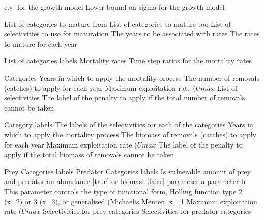  {c.v. for the growth model}
 {Lower bound on sigma for the growth model}
\par\textbf{}\par
{} {List of categories to mature from}
 {List of categories to mature too}
 {List of selectivities to use for maturation}
 {The years to be associated with rates}
 {The rates to mature for each year}
\par\textbf{}\par
{} {List of categories labels}
 {Mortality rates}
 {Time step ratios for the mortality rates}
\par\textbf{}\par
{} {Categories}
 {Years in which to apply the mortality process}
 {The number of removals (catches) to apply for each year}
 {Maximum exploitation rate ($Umax$}
 {List of selectivities}
 {The label of the penalty to apply if the total number of removals cannot be taken}
\par\textbf{}\par
{} {Category labels}
 {The labels of the selectivities for each of the categories}
 {Years in which to apply the mortality process}
 {The biomass of removals (catches) to apply for each year}
 {Maximum exploitation rate ($Umax$}
 {The label of the penalty to apply if the total biomass of removals cannot be taken}
\par\textbf{}\par
{} {Prey Categories labels}
 {Predator Categories labels}
 {Is vulnerable amount of prey and predator an abundance [true] or biomass [false]}
 {parameter a}
 {parameter b}
 {This parameter controls the type of functional form, Holling function type 2 (x=2) or 3 (x=3), or generalised (Michaelis Menten, x,=1}
 {Maximum exploitation rate ($Umax$}
 {Selectivities for prey categories}
 {Selectivities for predator categories}
